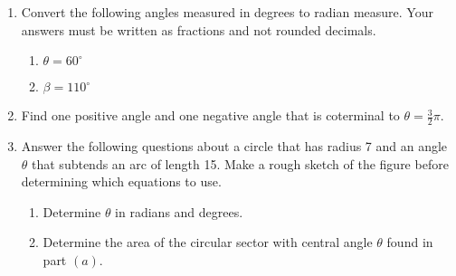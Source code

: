 

\begin{enumerate}
\item Convert the following angles measured in degrees to radian
  measure.  Your answers must be written as fractions and not rounded
  decimals.
\begin{enumerate}
\item $\theta=60^\circ$\vfill
\item $\beta=110^\circ$\vfill

\end{enumerate}

\item  Find one positive angle and one negative angle that is coterminal to $\displaystyle \theta=\frac{3}{2}\pi$.\vfill

\clearpage

\item Answer the following questions about a circle that has radius 7
  and an angle $\theta$ that subtends an arc of length 15. Make a
  rough sketch of the figure before determining which equations to
  use.
\begin{enumerate}
\item Determine $\theta$ in radians and degrees.

  \vfill
  
\item Determine the area of the circular sector with central angle
  $\theta$ found in part $(a)$.

  \vfill
  
\end{enumerate}


\end{enumerate}



